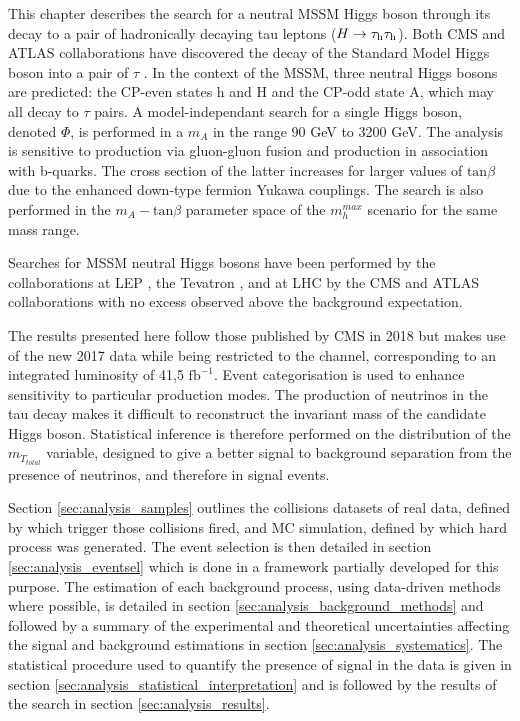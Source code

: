 This chapter describes the search for a neutral MSSM Higgs boson through its decay to a pair of hadronically decaying tau leptons ($H \rightarrow \tau_{\rm h}\tau_{\rm h}$). Both CMS and ATLAS collaborations have discovered the decay of the Standard Model Higgs boson into a pair of $\tau$ \cite{ATLASHtt,CMSHtt}. In the context of the MSSM, three neutral Higgs bosons are predicted: the CP-even states h and H and the CP-odd state A, which may all decay to $\tau$ pairs. A model-independant search for a single Higgs boson, denoted $\Phi$, is performed in a $m_A$ in the range 90 GeV to 3200 GeV. The analysis is sensitive to production via gluon-gluon fusion and production in association with b-quarks. The cross section of the latter increases for larger values of $\mathrm{tan}\beta$ due to the enhanced down-type fermion Yukawa couplings.  The search is also performed in the $m_A - \mathrm{tan}\beta$ parameter space of the $m_{h}^{max}$ scenario \cite{Carena2003} for the same mass range.

Searches for MSSM neutral Higgs bosons have been performed by the collaborations at LEP \cite{Schael2006}, the Tevatron \cite{Benjamin:2010xb}, and at LHC by the CMS and ATLAS collaborations \cite{Aaboud2018,Sirunyan2018} with no excess observed above the background expectation. 

The results presented here follow those published by CMS in 2018 but makes use of the new 2017 data while being restricted to the \tauh\tauh channel, corresponding to an integrated luminosity of 41,5 $\mathrm{fb^{-1}}$. Event categorisation is used to enhance sensitivity to particular production modes. The production of neutrinos in the tau decay makes it difficult to reconstruct the invariant mass of the candidate Higgs boson. Statistical inference is therefore performed on the distribution of the $m_{T_{total}}$ variable, designed to give a better signal to background separation from the presence of neutrinos, and therefore \MET in signal events.

Section \ref{sec:analysis_samples} outlines the collisions datasets of real data, defined by which trigger those collisions fired, and MC simulation, defined by which hard process was generated. The event selection is then detailed in section \ref{sec:analysis_eventsel} which is done in a framework partially developed for this purpose. The estimation of each background process, using data-driven methods where possible, is detailed in section \ref{sec:analysis_background_methods} and followed by a summary of the experimental and theoretical uncertainties affecting the signal and background estimations in section \ref{sec:analysis_systematics}. The statistical procedure used to quantify the presence of signal in the data is given in section \ref{sec:analysis_statistical_interpretation} and is followed by the results of the search in section \ref{sec:analysis_results}.

